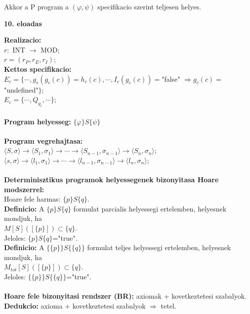 \documentclass[a4paper,10pt]{article}
\begin{document}
Akkor a P program a $(\varphi, \psi)$ specifikacio szerint teljesen helyes.
\newpage
%
%
\begin{flushleft}
\textbf{10. eloadas}
\end{flushleft}
\textbf{Realizacio:}\\
$r:$ INT $\to$ MOD;\\
$r=(r_P, r_E, r_I)$;\\
\textbf{Kettos specifikacio:}\\
$E_c=\lbrace\cdots, g_s(g_c(c))=h_c(c), \cdots, I_c(g_c(c))=$"false" $\Rightarrow g_c(c)=$"undefined"$\rbrace$;\\
$E_c=\lbrace\cdots, Q_{g_i}, \cdots\rbrace$;\\
\\
\textbf{Program helyesseg:} $\lbrace\varphi\rbrace S\lbrace\psi\rbrace$\\\\
\textbf{Program vegrehajtasa:}\\
$\langle S, \sigma\rangle \to\langle S_1, \sigma_1\rangle \to \cdots \to \langle S_{n-1}, \sigma_{n-1}\rangle \to \langle S_n, \sigma_n\rangle$;\\
$\langle s, \sigma\rangle \to\langle l_1, \sigma_1\rangle \to \cdots \to \langle l_{n-1}, \sigma_{n-1}\rangle \to \langle l_n, \sigma_n\rangle$;\\\\
\textbf{Determinisztikus programok helyessegenek bizonyitasa Hoare modszerrel:}\\
Hoare fele harmas: $\lbrace p\rbrace S\lbrace q\rbrace$.\\
\textbf{Definicio:} A $\lbrace p \rbrace S\lbrace q\rbrace$ formulat parcialis helyessegi ertelemben, helyesnek mondjuk, ha\\
$M[S]([\lbrace p\rbrace])\subset \lbrace q\rbrace$.\\
Jeloles: $\lbrace p\rbrace S\lbrace q\rbrace$="true".\\
\textbf{Definicio:} A $\lbrace\lbrace p\rbrace\rbrace S\lbrace\lbrace q\rbrace\rbrace$ formulat teljes helyessegi ertelemben, helyesnek mondjuk, ha\\
$M_{tot}[S]([\lbrace p\rbrace])\subset \lbrace q\rbrace$.\\
Jeloles: $\lbrace\lbrace p\rbrace\rbrace S\lbrace\lbrace q\rbrace\rbrace$="true".\\\\
\textbf{Hoare fele bizonyitasi rendszer (BR):} axiomak + kovetkeztetesi szabalyok.\\
\textbf{Dedukcio:} axioma + kovetkeztetesi szabalyok $\Rightarrow$ tetel.\\
\end{document}
